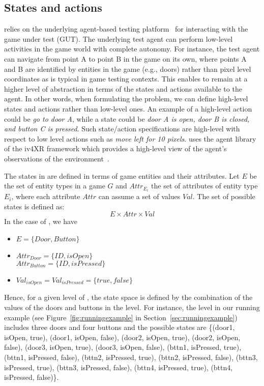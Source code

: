 \subsection{States and actions}
\approach relies on the underlying agent-based testing platform~\cite{prasetya2020aplib} for interacting with the game under test (GUT). The underlying test agent can perform low-level activities in the game world with complete autonomy. For instance, the test agent can navigate from point A to point B in the game on its own, where points A and B are identified by entities in the game (e.g., 
 doors) rather than pixel level coordinates as is typical in game testing contexts. This enables \approach to remain at a higher level of abstraction in terms of the states and actions available to the \rlacronym agent. In other words, when formulating the \rlacronym problem, we can define high-level states and actions rather than low-level ones. An example of a high-level action could be \emph{go to door A}, while a state could be \emph{door A is open, door B is closed, and button C is pressed}. Such state/action specifications are high-level with respect to low level actions such as \emph{move left for 10 pixels}. \approach uses the agent library of the iv4XR framework which provides a high-level view of the agent's observations of the environment~\cite{prasetya2020aplib}.

The states in \approach are defined in terms of game entities and their attributes. Let $E$ be the set of entity types in a game $G$ and 
$Attr_{E_i}$ the set of attributes of entity type $E_i$,
where each attribute $Attr$ can assume a set of values $Val$. The set of possible states is defined as: $$E \times Attr \times Val$$ %
In the case of \sut, we have
\begin{itemize}
    \item $E = \{Door, Button\}$
    \item $Attr_{Door} = \{ID, isOpen\}$ \\ $Attr_{Button} = \{ID, isPressed\}$
    \item $Val_{isOpen} = Val_{isPressed} = \{true, false\}$
\end{itemize}
Hence, for a given level of \sut, the state space is defined by the combination of the values of the doors and buttons in the level. For instance, the level \buttonsdoors in our running example (see Figure~\ref{fig:runningexample} in Section~\ref{sec:runningexample}) includes three doors and four buttons and  the possible states are \{(door1, isOpen, true), (door1, isOpen, false), (door2, isOpen, true), (door2, isOpen, false), (door3, isOpen, true), (door3, isOpen, false), (bttn1, isPressed, true),(bttn1, isPressed, false), (bttn2, isPressed, true), (bttn2, isPressed, false), (bttn3, isPressed, true), (bttn3, isPressed, false), (bttn4, isPressed, true), (bttn4, isPressed, false)\}.


